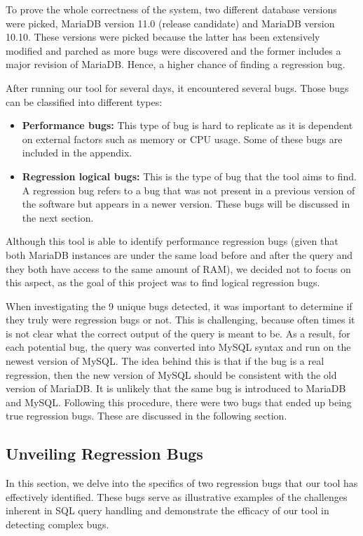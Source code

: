 \documentclass[sigconf]{acmart}
\begin{document}
To prove the whole correctness of the system, two different database versions were picked, MariaDB version 11.0 (release candidate) and MariaDB version 10.10. These versions were picked because the latter has been extensively modified and parched as more bugs were discovered and the former includes a major revision of MariaDB. Hence, a higher chance of finding a regression bug.

After running our tool for several days, it encountered several bugs. Those bugs can be classified into different types:
\begin{itemize}
    \item \textbf{Performance bugs:} This type of bug is hard to replicate as it is dependent on external factors such as memory or CPU usage. Some of these bugs are included in the appendix.
    \item \textbf{Regression logical bugs:} This is the type of bug that the tool aims to find. A regression bug refers to a bug that was not present in a previous version of the software but appears in a newer version. These bugs will be discussed in the next section.
\end{itemize}
Although this tool is able to identify performance regression bugs (given that both MariaDB instances are under the same load before and after the query and they both have access to the same amount of RAM), we decided not to focus on this aspect, as the goal of this project was to find logical regression bugs.

When investigating the 9 unique bugs detected, it was important to determine if they truly were regression bugs or not. This is challenging, because often times it is not clear what the correct output of the query is meant to be. As a result, for each potential bug, the query was converted into MySQL syntax and run on the newest version of MySQL. The idea behind this is that if the bug is a real regression, then the new version of MySQL should be consistent with the old version of MariaDB. It is unlikely that the same bug is introduced to MariaDB and MySQL. Following this procedure, there were two bugs that ended up being true regression bugs. These are discussed in the following section.

\subsection{Unveiling Regression Bugs}

In this section, we delve into the specifics of two regression bugs that our tool has effectively identified. These bugs serve as illustrative examples of the challenges inherent in SQL query handling and demonstrate the efficacy of our tool in detecting complex bugs.
\end{document}
